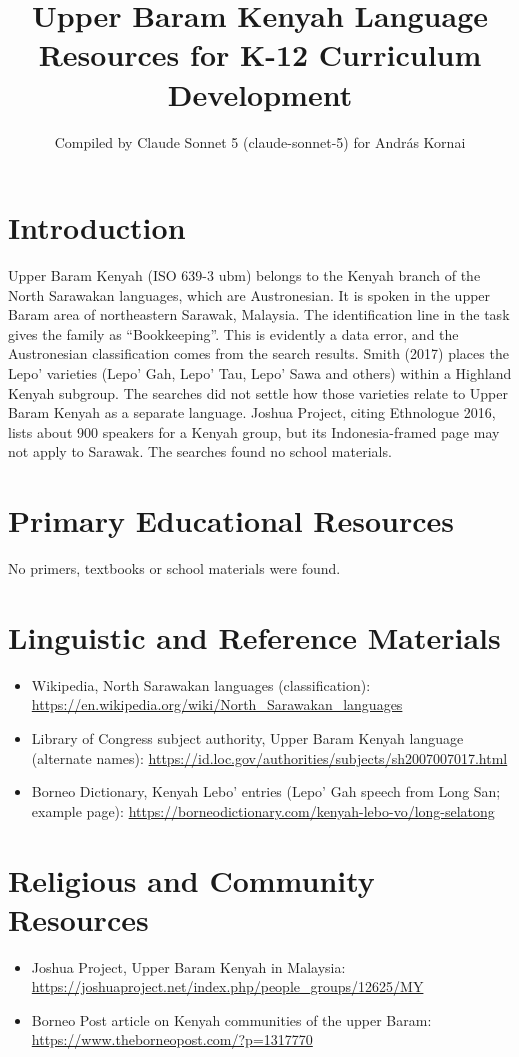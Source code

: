 \documentclass[12pt]{article}
\title{Upper Baram Kenyah Language Resources for K-12 Curriculum Development}
\author{Compiled by Claude Sonnet 5 (claude-sonnet-5) for Andr\'as Kornai}
\date{}
\begin{document}
\maketitle

\section{Introduction}
Upper Baram Kenyah (ISO 639-3 ubm) belongs to the Kenyah branch of the North Sarawakan languages, which are Austronesian. It is spoken in the upper Baram area of northeastern Sarawak, Malaysia. The identification line in the task gives the family as ``Bookkeeping''. This is evidently a data error, and the Austronesian classification comes from the search results. Smith (2017) places the Lepo' varieties (Lepo' Gah, Lepo' Tau, Lepo' Sawa and others) within a Highland Kenyah subgroup. The searches did not settle how those varieties relate to Upper Baram Kenyah as a separate language. Joshua Project, citing Ethnologue 2016, lists about 900 speakers for a Kenyah group, but its Indonesia-framed page may not apply to Sarawak. The searches found no school materials.

\section{Primary Educational Resources}
No primers, textbooks or school materials were found.

\section{Linguistic and Reference Materials}
\begin{itemize}
\item Wikipedia, North Sarawakan languages (classification): \url{https://en.wikipedia.org/wiki/North_Sarawakan_languages}
\item Library of Congress subject authority, Upper Baram Kenyah language (alternate names): \url{https://id.loc.gov/authorities/subjects/sh2007007017.html}
\item Borneo Dictionary, Kenyah Lebo' entries (Lepo' Gah speech from Long San; example page): \url{https://borneodictionary.com/kenyah-lebo-vo/long-selatong}
\end{itemize}

\section{Religious and Community Resources}
\begin{itemize}
\item Joshua Project, Upper Baram Kenyah in Malaysia: \url{https://joshuaproject.net/index.php/people_groups/12625/MY}
\item Borneo Post article on Kenyah communities of the upper Baram: \url{https://www.theborneopost.com/?p=1317770}
\end{itemize}
\end{document}
